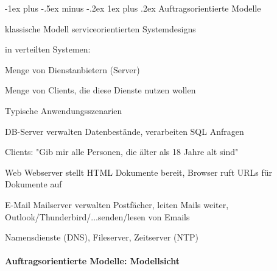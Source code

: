 \documentclass[10pt]{article}
\makeatletter
\renewcommand{\subsubsection}{\@startsection{subsubsection}{3}{0mm}%
                                {-1ex plus -.5ex minus -.2ex}%
                                {1ex plus .2ex}%
                                {\normalfont\small\bfseries}}
\makeatother
\begin{document}
\subsubsection{Auftragsorientierte Modelle}
\begin{itemize*}
  \item klassische Modell serviceorientierten Systemdesigns
  \item in verteilten Systemen:
  \begin{itemize*}
    \item Menge von Dienstanbietern (Server)
    \item Menge von Clients, die diese Dienste nutzen wollen
  \end{itemize*}
\end{itemize*}
Typische Anwendungsszenarien
\begin{description*}
  \item[DB-Server] verwalten Datenbestände, verarbeiten SQL Anfragen
  \begin{itemize*}
    \item Clients: "Gib mir alle Personen, die älter als 18 Jahre alt sind"
  \end{itemize*}
  \item[Web] Webserver stellt HTML Dokumente bereit, Browser ruft URLs für Dokumente auf
  \item[E-Mail] Mailserver verwalten Postfächer, leiten Mails weiter, Outlook/Thunderbird/...senden/lesen von Emails
  \item[Namensdienste (DNS), Fileserver, Zeitserver (NTP)]
\end{description*}

\paragraph{Auftragsorientierte Modelle: Modellsicht}
\end{document}
